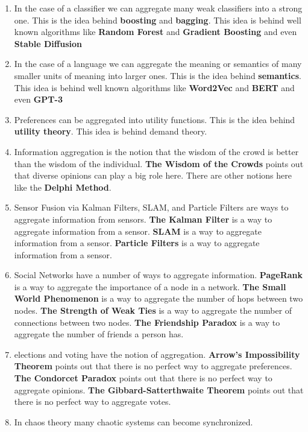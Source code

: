 \documentclass[
  letterpaper,
  DIV=11,
  numbers=noendperiod,
  oneside]{scrartcl}
\begin{document}
\begin{tcolorbox}
\begin{enumerate}
  \begin{quote}
  ``Imagine how difficult physics would be if electrons could think.''
  -- Murray Gell-Mann
  \end{quote}
\item
  In the case of a classifier we can aggregate many weak classifiers
  into a strong one. This is the idea behind \textbf{boosting} and
  \textbf{bagging}. This idea is behind well known algorithms like
  \textbf{Random Forest} and \textbf{Gradient Boosting} and even
  \textbf{Stable Diffusion}
\item
  In the case of a language we can aggregate the meaning or semantics of
  many smaller units of meaning into larger ones. This is the idea
  behind \textbf{semantics}. This idea is behind well known algorithms
  like \textbf{Word2Vec} and \textbf{BERT} and even \textbf{GPT-3}
\item
  Preferences can be aggregated into utility functions. This is the idea
  behind \textbf{utility theory}. This idea is behind demand theory.
\item
  Information aggregation is the notion that the wisdom of the crowd is
  better than the wisdom of the individual. \textbf{The Wisdom of the
  Crowds} points out that diverse opinions can play a big role here.
  There are other notions here like the \textbf{Delphi Method}.
\item
  Sensor Fusion via Kalman Filters, SLAM, and Particle Filters are ways
  to aggregate information from sensors. \textbf{The Kalman Filter} is a
  way to aggregate information from a sensor. \textbf{SLAM} is a way to
  aggregate information from a sensor. \textbf{Particle Filters} is a
  way to aggregate information from a sensor.
\item
  Social Networks have a number of ways to aggregate information.
  \textbf{PageRank} is a way to aggregate the importance of a node in a
  network. \textbf{The Small World Phenomenon} is a way to aggregate the
  number of hops between two nodes. \textbf{The Strength of Weak Ties}
  is a way to aggregate the number of connections between two nodes.
  \textbf{The Friendship Paradox} is a way to aggregate the number of
  friends a person has.
\item
  elections and voting have the notion of aggregation. \textbf{Arrow's
  Impossibility Theorem} points out that there is no perfect way to
  aggregate preferences. \textbf{The Condorcet Paradox} points out that
  there is no perfect way to aggregate opinions. \textbf{The
  Gibbard-Satterthwaite Theorem} points out that there is no perfect way
  to aggregate votes.
\item
  In chaos theory many chaotic systems can become synchronized.
\end{enumerate}

\end{tcolorbox}
\end{document}

